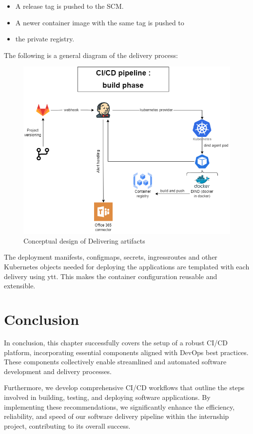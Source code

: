 \begin{itemize}[label={--}]
\item A release tag is pushed to the SCM. 
\item A newer container image with the same tag is pushed to \item the private registry. 
\end{itemize}

The following is a general diagram of the delivery process: 

\begin{figure}[H]\centering
\includegraphics[width=1.0\textwidth,angle=00]{assets/f49.png}
\caption{Conceptual design of Delivering artifacts }
\label{fig:Conceptual design of Delivering artifacts }
\end{figure}

The deployment manifests, configmaps, secrets, ingressroutes and other Kubernetes objects needed for deploying the applications are templated with each delivery using ytt. This makes the container configuration reusable and extensible.

\section{Conclusion}

In conclusion, this chapter successfully covers the setup of a robust CI/CD platform, incorporating essential components aligned with DevOps best practices. These components collectively enable streamlined and automated software development and delivery processes.

Furthermore, we develop comprehensive CI/CD workflows that outline the steps involved in building, testing, and deploying software applications. By implementing these recommendations, we significantly enhance the efficiency, reliability, and speed of our software delivery pipeline within the internship project, contributing to its overall success.